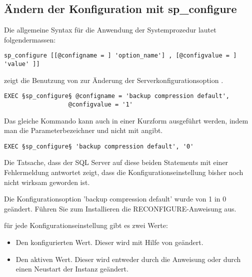       \subsection{Ändern der Konfiguration mit sp\_configure}
        Die allgemeine Syntax f\"ur die Anwendung der Systemprozedur
         lautet folgendermassen:
        \begin{lstlisting}[language=ms_sql,caption={Die Syntax von
sp\_configure},label=admin03_01]
sp_configure [[@configname = ] 'option_name'] , [@configvalue = ] 'value' ]]
          \end{lstlisting}
         zeigt die Benutzung von
         zur Änderung der
        Serverkonfigurationsoption .
        \begin{lstlisting}[language=ms_sql,caption={Ein erstes Beispiel zur
          Nutzung von sp\_configure},label=admin03_02]
EXEC §sp_configure§ @configname = 'backup compression default', 
                  @configvalue = '1'
          \end{lstlisting}
        Das gleiche Kommando kann auch in einer Kurzform ausgeführt werden,
        indem man die Parameterbezeichner  und
         nicht mit angibt.
        \begin{lstlisting}[language=ms_sql,caption={Die Kurzform der Syntax
          f\"ur sp\_configure},label=admin03_03]
EXEC §sp_configure§ 'backup compression default', '0'
          \end{lstlisting}
        Die Tatsache, dass der SQL Server auf diese beiden Statements mit einer
        Fehlermeldung antwortet zeigt, dass die Konfigurationseinstellung
        bisher noch nicht wirksam geworden ist.
        \begin{small}
          \begin{mssql}
Die Konfigurationsoption 'backup compression default' wurde von 1 in
0 geändert. Führen Sie zum Installieren die RECONFIGURE-Anweisung
aus.
            \end{mssql}
        \end{small}
        f\"ur jede Konfigurationseinstellung gibt es zwei Werte:
        \begin{itemize}
            \item Den konfigurierten Wert. Dieser wird mit Hilfe von
             geändert.
            \item Den aktiven Wert. Dieser wird entweder durch die Anweisung
             oder durch einen Neustart der Instanz
            geändert.
        \end{itemize}
